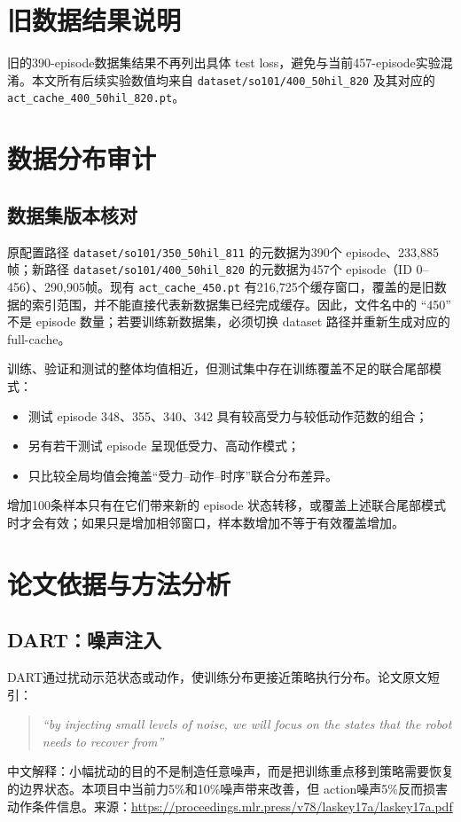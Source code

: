 \documentclass[UTF8,a4paper,11pt,fontset=none]{ctexart}
\begin{document}
\section{旧数据结果说明}
旧的390-episode数据集结果不再列出具体 test loss，避免与当前457-episode实验混淆。本文所有后续实验数值均来自
\texttt{dataset/so101/400\_50hil\_820} 及其对应的
\texttt{act\_cache\_400\_50hil\_820.pt}。

\section{数据分布审计}
\subsection{数据集版本核对}
原配置路径 \texttt{dataset/so101/350\_50hil\_811} 的元数据为390个 episode、233,885帧；新路径 \texttt{dataset/so101/400\_50hil\_820} 的元数据为457个 episode（ID 0--456）、290,905帧。现有 \texttt{act\_cache\_450.pt} 有216,725个缓存窗口，覆盖的是旧数据的索引范围，并不能直接代表新数据集已经完成缓存。因此，文件名中的 ``450'' 不是 episode 数量；若要训练新数据集，必须切换 dataset 路径并重新生成对应的 full-cache。

训练、验证和测试的整体均值相近，但测试集中存在训练覆盖不足的联合尾部模式：
\begin{itemize}
  \item 测试 episode 348、355、340、342 具有较高受力与较低动作范数的组合；
  \item 另有若干测试 episode 呈现低受力、高动作模式；
  \item 只比较全局均值会掩盖“受力--动作--时序”联合分布差异。
\end{itemize}
增加100条样本只有在它们带来新的 episode 状态转移，或覆盖上述联合尾部模式时才会有效；如果只是增加相邻窗口，样本数增加不等于有效覆盖增加。

\section{论文依据与方法分析}
\subsection{DART：噪声注入}
DART通过扰动示范状态或动作，使训练分布更接近策略执行分布。论文原文短引：\begin{quote}\emph{``by injecting small levels of noise, we will focus on the states that the robot needs to recover from''}\end{quote}
中文解释：小幅扰动的目的不是制造任意噪声，而是把训练重点移到策略需要恢复的边界状态。本项目中当前力5\%和10\%噪声带来改善，但 action噪声5\%反而损害动作条件信息。来源：\url{https://proceedings.mlr.press/v78/laskey17a/laskey17a.pdf}
\end{document}
